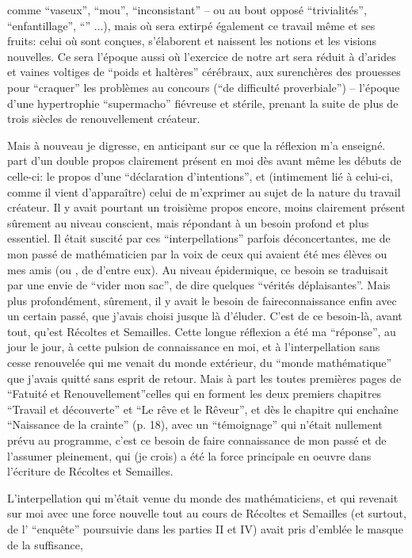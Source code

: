  comme ``vaseux'', ``mou'', ``inconsistant'' -- ou au bout opposé ``trivialités'', ``enfantillage'', ``'' ...), mais où sera extirpé également ce travail même et ses fruits: celui où sont conçues, s'élaborent et naissent les notions et les visions nouvelles. Ce sera l'époque aussi où l'exercice de notre art sera réduit à d'arides et vaines voltiges de ``poids et haltères'' cérébraux, aux surenchères des prouesses pour ``craquer'' les problèmes au concours (``de difficulté proverbiale'') -- l'époque d'une hypertrophie ``supermacho'' fiévreuse et stérile, prenant la suite de plus de trois siècles de renouvellement créateur.

 Mais à nouveau je digresse, en anticipant sur ce que la réflexion m'a enseigné.  part d'un double propos\inserted{,} clairement présent en moi dès avant même les débuts de celle-ci: le propos d'une ``déclaration d'intentions'', et (intimement lié à celui-ci, comme il vient d'apparaître) celui de m'exprimer au sujet de la nature du travail créateur. Il y avait pourtant un troisième propos encore, moins clairement présent sûrement au niveau conscient, mais répondant à un besoin  profond et plus essentiel. Il était suscité par ces ``interpellations'' parfois déconcertantes, me  de mon passé de mathématicien par la voix de ceux qui avaient été mes élèves ou mes amis\unsure{(} (ou , de  d'entre eux). Au niveau épidermique, ce besoin se traduisait par une envie de ``vider mon sac'', de dire quelques ``vérités déplaisantes''. Mais plus profondément, sûrement, il y avait le besoin de  f\enspace a\enspace i\enspace r\enspace e\quad c\enspace o\enspace n\enspace n\enspace a\enspace i\enspace s\enspace s\enspace a\enspace n\enspace c\enspace e enfin avec un certain passé, que j'avais choisi jusque là d'éluder. C'est de ce besoin-là, avant tout, qu'est  Récoltes et Semailles. Cette longue réflexion a été ma ``réponse'', au jour le jour, à cette pulsion de connaissance en moi, et à l'interpellation sans cesse renouvelée qui me venait du monde extérieur, du ``monde mathématique'' que j'avais quitté sans esprit de retour. Mais à part les toutes premières pages de ``Fatuité et Renouvellement''\deleted{,}\inserted{(}celles qui en forment les deux premiers chapitres ``Travail et découverte'' et ``Le rêve et le Rêveur''\inserted{)}, et dès le chapitre qui enchaîne ``Naissance de la crainte'' (p. 18), avec un ``témoignage'' qui n'était nullement prévu au programme, c'est ce besoin de faire connaissance de mon passé et de l'assumer pleinement, qui (je crois) a été la force principale en oeuvre dans l'écriture de Récoltes et Semailles.

L'interpellation qui m'était venue du monde des mathématiciens, et qui revenait sur moi avec une force nouvelle tout au cours  de Récoltes et Semailles (et surtout, de l' ``enquête'' poursuivie dans les parties II et IV) avait pris d'emblée le masque de la suffisance,
